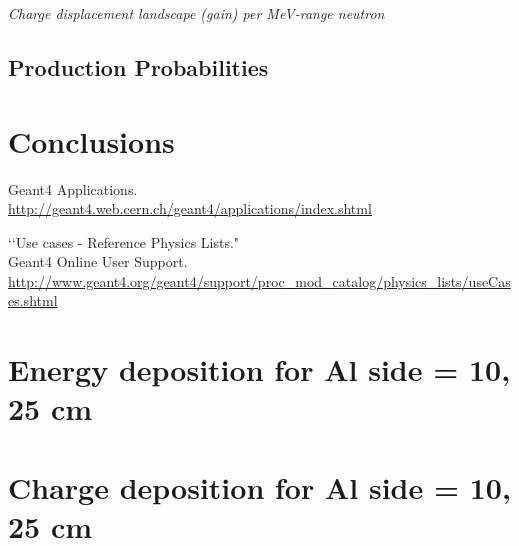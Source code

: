 \documentclass[11pt]{article}
\makeatletter
\newenvironment{figurehere}
{\def\@captype{figure}}{}
\makeatother
\begin{document}
\begin{multicols}{2}
\vspace{0.15 cm}
\begin{figurehere}
\centering
{}
\caption{\small \emph{Charge displacement landscape (gain) per MeV-range neutron}}
\label{fig:nChargeDep_MeV}
\end{figurehere}
\vspace{0.15 cm}


\subsection{Production Probabilities}



\section{Conclusions}

\begin{thebibliography}{99}

Geant4 Applications. \\
\url{http://geant4.web.cern.ch/geant4/applications/index.shtml}

\lq\lq Use cases - Reference Physics Lists." \\
Geant4 Online User Support. \\
\url{http://www.geant4.org/geant4/support/proc_mod_catalog/physics_lists/useCases.shtml}
 
\end{thebibliography}

\end{multicols}

\appendix
\newpage
\section{Energy deposition for Al side = 10, 25 cm}\label{app:EDep}

\newpage
\section{Charge deposition for Al side = 10, 25 cm}\label{app:ChargeDep}
\end{document}
